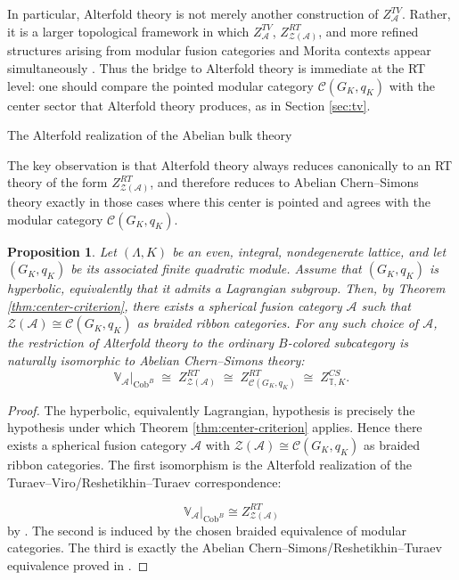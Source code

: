\documentclass[12pt]{amsart}
\makeatletter
\renewcommand\subsection{\@startsection{subsection}{2}%
  \z@{.5\linespacing\@plus.7\linespacing}{-.5em}%
  {\normalfont\bfseries}}
\numberwithin{equation}{section}
\newtheorem{prop}[theorem]{Proposition}
\theoremstyle{definition}
\makeatother
\begin{document}
In particular, Alterfold theory is not merely another construction of $Z^{TV}_{\mathcal A}$. Rather, it is a larger topological framework in which $Z^{TV}_{\mathcal A}$, $Z^{RT}_{\mathcal Z(\mathcal A)}$, and more refined structures arising from modular fusion categories and Morita contexts appear simultaneously \cite{Alterfold1,Alterfold2}. Thus the bridge to Alterfold theory is immediate at the RT level: one should compare the pointed modular category $\mathcal C(G_K,q_K)$ with the center sector that Alterfold theory produces, as in Section \ref{sec:tv}.


\subsection{The Alterfold realization of the Abelian bulk theory}

The key observation is that Alterfold theory always reduces canonically to an RT theory of the form $Z^{RT}_{\mathcal Z(\mathcal A)}$, and therefore reduces to Abelian Chern--Simons theory exactly in those cases where this center is pointed and agrees with the modular category $\mathcal C(G_K,q_K)$.


\begin{prop}
\label{prop:Alterfold-cs-reduction}
Let $(\Lambda,K)$ be an even, integral, nondegenerate lattice, and let $(G_K,q_K)$ be its associated finite quadratic module. Assume that $(G_K,q_K)$ is hyperbolic, equivalently that it admits a Lagrangian subgroup. Then, by Theorem \ref{thm:center-criterion}, there exists a spherical fusion category $\mathcal A$ such that $\mathcal Z(\mathcal A)\cong \mathcal C(G_K,q_K)$ as braided ribbon categories. For any such choice of $\mathcal A$, the restriction of Alterfold theory to the ordinary $B$-colored subcategory is naturally isomorphic to Abelian Chern--Simons theory:
$$
\mathbb V_{\mathcal A}\big|_{\mathrm{Cob}^B}
\;\cong\;
Z^{RT}_{\mathcal Z(\mathcal A)}
\;\cong\;
Z^{RT}_{\mathcal C(G_K,q_K)}
\;\cong\;
Z^{CS}_{\mathbb T,K}.
$$
\end{prop}

\begin{proof}
The hyperbolic, equivalently Lagrangian, hypothesis is precisely the hypothesis under which Theorem \ref{thm:center-criterion} applies. Hence there exists a spherical fusion category $\mathcal A$ with $\mathcal Z(\mathcal A)\cong \mathcal C(G_K,q_K)$ as braided ribbon categories. The first isomorphism is the Alterfold realization of the Turaev--Viro/Reshetikhin--Turaev correspondence:

$$
\mathbb V_{\mathcal A}\big|_{\mathrm{Cob}^B}\cong Z^{RT}_{\mathcal Z(\mathcal A)}
$$
by \cite[Theorem 5.1]{Alterfold1}. The second is induced by the chosen braided equivalence of modular categories. The third is exactly the Abelian Chern--Simons/Reshetikhin--Turaev equivalence proved in \cite{Galviz3}.
\end{proof}
\end{document}
